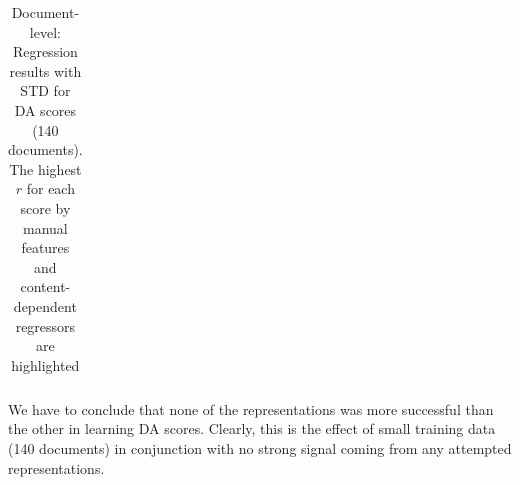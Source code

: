 \begin{table}[H]
\begin{tabular}{l|cl|cl}
		\bottomrule
	\end{tabular}
\caption{\label{tab:da_doc_res}Document-level: Regression results with STD for DA scores (140 documents). The highest $r$ for each score by manual features and content-dependent regressors are highlighted}
\end{table}

\vspace{-1.5em}

We have to conclude that none of the representations was more successful than the other in learning DA scores. Clearly, this is the effect of small training data (140 documents) in conjunction with no strong signal coming from any attempted representations. 
\vspace{-.5em}

